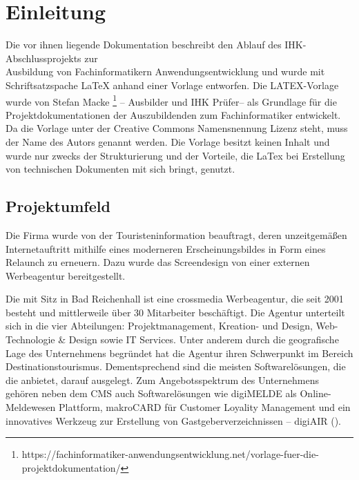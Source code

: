 \section{Einleitung}
\label{sec:Einleitung}
Die vor ihnen liegende Dokumentation beschreibt den Ablauf des
IHK-Abschlussprojekts zur \\ Ausbildung von Fachinformatikern
Anwendungsentwicklung und wurde mit Schriftsatzspache LaTeX anhand einer Vorlage entworfen. Die
LATEX-Vorlage wurde von Stefan Macke
\footnote{https://fachinformatiker-anwendungsentwicklung.net/vorlage-fuer-die-projektdokumentation/} -- Ausbilder und IHK Prüfer-- als Grundlage für die Projektdokumentationen der Auszubildenden zum Fachinformatiker entwickelt.
Da die Vorlage unter der Creative Commons Namensnennung Lizenz steht, muss der
Name des Autors genannt werden. Die Vorlage besitzt keinen Inhalt und wurde nur
zwecks der Strukturierung und der Vorteile, die LaTex bei Erstellung von
technischen Dokumenten mit sich bringt, genutzt.

\subsection{Projektumfeld} 
\label{sec:Projektumfeld}
Die Firma \mh wurde von der Touristeninformation \kunde beauftragt, deren
unzeitgemäßen Internetauftritt mithilfe eines moderneren Erscheinungsbildes in
Form eines Relaunch zu erneuern. Dazu wurde das Screendesign von einer
externen Werbeagentur bereitgestellt.

Die \mh mit Sitz in Bad Reichenhall ist eine crossmedia Werbeagentur, 
die seit 2001 besteht und mittlerweile über 30 Mitarbeiter beschäftigt. 
Die Agentur unterteilt sich in die vier
Abteilungen: Projektmanagement, Kreation- und Design, Web-Technologie \& Design
sowie IT Services. Unter anderem durch die geografische Lage des Unternehmens 
begründet hat die Agentur ihren Schwerpunkt im Bereich Destinationstourismus.
Dementsprechend sind die meisten Softwarelösungen, die die \mh anbietet, darauf ausgelegt.
Zum Angebotsspektrum des Unternehmens gehören neben dem \ac{CMS} \ct 
auch Softwarelösungen wie digiMELDE als Online-Meldewesen Plattform, makroCARD
für Customer Loyality Management und ein innovatives Werkzeug zur
Erstellung von Gastgeberverzeichnissen -- digiAIR ().



